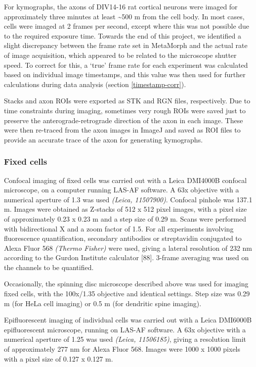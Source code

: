 \documentclass[
  12pt,
  a4paper,
]{book}
\begin{document}
For kymographs, the axons of DIV14-16 rat cortical neurons were imaged for approximately three minutes at least \textasciitilde500 \textmu{}m from the cell body. In most cases, cells were imaged at 2 frames per second, except where this was not possible due to the required exposure time. Towards the end of this project, we identified a slight discrepancy between the frame rate set in MetaMorph and the actual rate of image acquisition, which appeared to be related to the microscope shutter speed. To correct for this, a `true' frame rate for each experiment was calculated based on individual image timestamps, and this value was then used for further calculations during data analysis (section \ref{timestamp-corr}).

Stacks and axon ROIs were exported as STK and RGN files, respectively. Due to time constraints during imaging, sometimes very rough ROIs were saved just to preserve the anterograde-retrograde direction of the axon in each image. These were then re-traced from the axon images in ImageJ and saved as ROI files to provide an accurate trace of the axon for generating kymographs.

\hypertarget{fixed-cells}{%
\subsubsection{Fixed cells}\label{fixed-cells}}

Confocal imaging of fixed cells was carried out with a Leica DMI4000B confocal microscope, on a computer running LAS-AF software. A 63x objective with a numerical aperture of 1.3 was used \emph{(Leica, 11507900)}. Confocal pinhole was 137.1 \textmu{}m. Images were obtained as Z-stacks of 512 x 512 pixel images, with a pixel size of approximately 0.23 x 0.23 \textmu{}m and a step size of 0.29 \textmu{}m. Scans were performed with bidirectional X and a zoom factor of 1.5. For all experiments involving fluorescence quantification, secondary antibodies or streptavidin conjugated to Alexa Fluor 568 \emph{(Thermo Fisher)} were used, giving a lateral resolution of 232 nm according to the Gurdon Institute calculator {[}88{]}. 3-frame averaging was used on the channels to be quantified.

Occasionally, the spinning disc microscope described above was used for imaging fixed cells, with the 100x/1.35 objective and identical settings. Step size was 0.29 \textmu{}m (for HeLa cell imaging) or 0.5 \textmu{}m (for dendritic spine imaging).

Epifluorescent imaging of individual cells was carried out with a Leica DMI6000B epifluorescent microscope, running on LAS-AF software. A 63x objective with a numerical aperture of 1.25 was used \emph{(Leica, 11506185)}, giving a resolution limit of approximately 277 nm for Alexa Fluor 568. Images were 1000 x 1000 pixels with a pixel size of 0.127 x 0.127 \textmu{}m.
\end{document}
